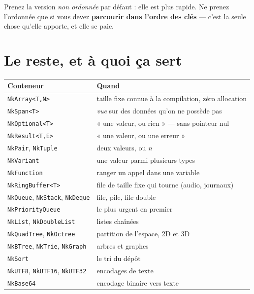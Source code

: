\begin{nkretenir}
Prenez la version \emph{non ordonnée} par défaut : elle est plus rapide. Ne
prenez l'ordonnée que si vous devez \textbf{parcourir dans l'ordre des clés} ---
c'est la seule chose qu'elle apporte, et elle se paie.
\end{nkretenir}

\section{Le reste, et à quoi ça sert}

\begin{center}
\begin{tabular}{@{}ll@{}}
\toprule
\textbf{Conteneur} & \textbf{Quand} \\
\midrule
\texttt{NkArray<T,N>} & taille fixe connue à la compilation, zéro allocation \\
\texttt{NkSpan<T>} & \emph{vue} sur des données qu'on ne possède pas \\
\texttt{NkOptional<T>} & « une valeur, ou rien » --- sans pointeur nul \\
\texttt{NkResult<T,E>} & « une valeur, ou une erreur » \\
\texttt{NkPair}, \texttt{NkTuple} & deux valeurs, ou \emph{n} \\
\texttt{NkVariant} & une valeur parmi plusieurs types \\
\texttt{NkFunction} & ranger un appel dans une variable \\
\texttt{NkRingBuffer<T>} & file de taille fixe qui tourne (audio, journaux) \\
\texttt{NkQueue}, \texttt{NkStack}, \texttt{NkDeque} & file, pile, file double \\
\texttt{NkPriorityQueue} & le plus urgent en premier \\
\texttt{NkList}, \texttt{NkDoubleList} & listes chaînées \\
\texttt{NkQuadTree}, \texttt{NkOctree} & partition de l'espace, 2D et 3D \\
\texttt{NkBTree}, \texttt{NkTrie}, \texttt{NkGraph} & arbres et graphes \\
\texttt{NkSort} & le tri du dépôt \\
\texttt{NkUTF8}, \texttt{NkUTF16}, \texttt{NkUTF32} & encodages de texte \\
\texttt{NkBase64} & encodage binaire vers texte \\
\bottomrule
\end{tabular}
\end{center}

